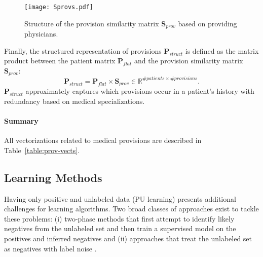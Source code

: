 \begin{figure}[!h]
  \centering
  \texttt{[image: Sprovs.pdf]}
  \caption{Structure of the provision similarity matrix $\mathbf{S}_{prov}$ based on providing physicians.} 
  \label{fig:Sprovs}
\end{figure}

Finally, the structured representation of provisions $\mathbf{P}_{struct}$ is defined as the matrix product between the patient matrix $\mathbf{P}_{flat}$ and the provision similarity matrix $\mathbf{S}_{prov}$:
\begin{equation}
\mathbf{P}_{struct} = \mathbf{P}_{flat} \times \mathbf{S}_{prov} \in \mathbb{R}^{\# patients \times \# provisions}.
\end{equation}
$\mathbf{P}_{struct}$ approximately captures which provisions occur in a patient's history with redundancy based on medical specializations.

\paragraph{Summary} All vectorizations related to medical provisions are described in Table~\ref{table:prov-vects}.
\begin{table}[!h]
\centering
{}
\caption{Summary of vectorization schemes used for records of medical provisions.}
\label{table:prov-vects}
\end{table}


\subsection{Learning Methods} \label{learning-methods}
Having only positive and unlabeled data (PU learning) presents additional challenges for learning algorithms. Two broad classes of approaches exist to tackle these problems: (i) two-phase methods that first attempt to identify likely negatives from the unlabeled set and then train a supervised model on the positives and inferred negatives \citep{liu02partially, Yu:2005:SCM:1108759.1108762} and (ii) approaches that treat the unlabeled set as negatives with label noise \citep{Elkan:2008:LCO:1401890.1401920,Lee03learningwith,mordelet2014bagging,Claesen2015resvm}. 

